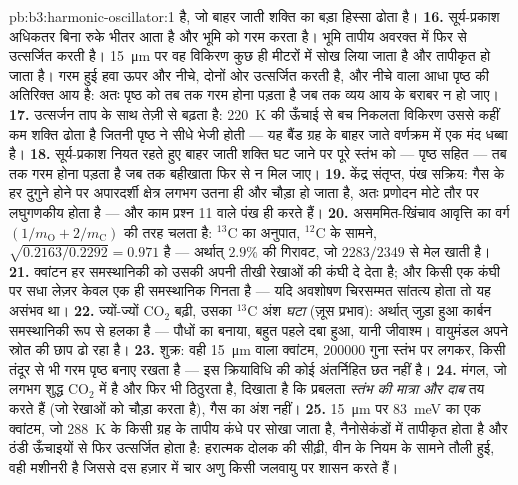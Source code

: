 \begin{solution}{pb:b3:harmonic-oscillator:1}
है, जो बाहर जाती शक्ति का बड़ा हिस्सा ढोता है।
\textbf{16.} सूर्य-प्रकाश अधिकतर बिना रुके भीतर आता है और भूमि को
गरम करता है। भूमि तापीय अवरक्त में फिर से उत्सर्जित करती है।
\qty{15}{\micro m} पर वह विकिरण कुछ ही मीटरों में सोख लिया जाता है और
तापीकृत हो जाता है। गरम हुई हवा ऊपर और नीचे, दोनों ओर उत्सर्जित करती
है, और नीचे वाला आधा पृष्ठ की अतिरिक्त आय है: अतः पृष्ठ को तब तक गरम
होना पड़ता है जब तक व्यय आय के बराबर न हो जाए।
\textbf{17.} उत्सर्जन ताप के साथ तेज़ी से बढ़ता है: \qty{220}{K} की
ऊँचाई से बच निकलता विकिरण उससे कहीं कम शक्ति ढोता है जितनी पृष्ठ ने
सीधे भेजी होती --- यह बैंड ग्रह के बाहर जाते वर्णक्रम में एक मंद
धब्बा है।
\textbf{18.} सूर्य-प्रकाश नियत रहते हुए बाहर जाती शक्ति घट जाने पर
पूरे स्तंभ को --- पृष्ठ सहित --- तब तक गरम होना पड़ता है जब तक
बहीखाता फिर से न मिल जाए।
\textbf{19.} केंद्र संतृप्त, पंख सक्रिय: गैस के हर दुगुने होने पर
अपारदर्शी क्षेत्र लगभग उतना ही और चौड़ा हो जाता है, अतः प्रणोदन
मोटे तौर पर लघुगणकीय होता है --- और काम प्रश्न 11 वाले पंख ही करते हैं।
\textbf{20.} असममित-खिंचाव आवृत्ति का वर्ग $(1/m_{
\text{O}} + 2/m_{\text{C}})$ की तरह चलता है: $^{13}$C का अनुपात,
$^{12}$C के सामने, $\sqrt{0.2163/0.2292} = 0.971$ है --- अर्थात्
$2.9\%$ की गिरावट, जो $2283/2349$ से मेल खाती है।
\textbf{21.} क्वांटन हर समस्थानिकी को उसकी अपनी तीखी रेखाओं की
कंघी दे देता है; और किसी एक कंघी पर सधा लेज़र केवल एक ही समस्थानिक
गिनता है --- यदि अवशोषण चिरसम्मत सांतत्य होता तो यह असंभव था।
\textbf{22.} ज्यों-ज्यों CO$_2$ बढ़ी, उसका $^{13}$C अंश
\emph{घटा} (ज़ूस प्रभाव): अर्थात् जुड़ा हुआ कार्बन समस्थानिकी रूप से
हलका है --- पौधों का बनाया, बहुत पहले दबा हुआ, यानी जीवाश्म।
वायुमंडल अपने स्रोत की छाप ढो रहा है।
\textbf{23.} शुक्र: वही \qty{15}{\micro m} वाला क्वांटम, $200000$
गुना स्तंभ पर लगकर, किसी तंदूर से भी गरम पृष्ठ बनाए रखता है
--- इस क्रियाविधि की कोई अंतर्निहित छत नहीं है।
\textbf{24.} मंगल, जो लगभग शुद्ध CO$_2$ में है और फिर भी ठिठुरता है,
दिखाता है कि प्रबलता \emph{स्तंभ की मात्रा और दाब} तय करते हैं
(जो रेखाओं को चौड़ा करता है), गैस का अंश नहीं।
\textbf{25.} \qty{15}{\micro m} पर \qty{83}{meV} का एक क्वांटम,
जो \qty{288}{K} के किसी ग्रह के तापीय कंधे पर सोखा जाता है,
नैनोसेकंडों में तापीकृत होता है और ठंडी ऊँचाइयों से फिर उत्सर्जित होता
है: हरात्मक दोलक की सीढ़ी, वीन के नियम के सामने तौली हुई, वही मशीनरी
है जिससे दस हज़ार में चार अणु किसी जलवायु पर शासन करते हैं।
\end{solution}
